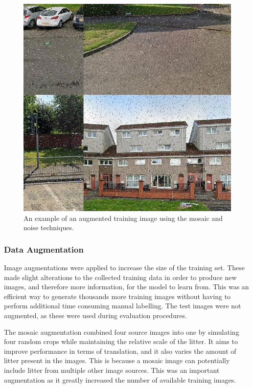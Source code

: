 \documentclass{thesis}
\begin{document}
\begin{figure}[h!]
    \centering
    \includegraphics[scale=0.4]{images/mosaic-noise-example.jpg}
    \caption{An example of an augmented training image using the mosaic and noise techniques.}
    \label{fig:mosaic-noise-image}
\end{figure}

\subsubsection{Data Augmentation}

Image augmentations were applied to increase the size of the training set. These made slight alterations to the collected training data in order to produce new images, and therefore more information, for the model to learn from. This was an efficient way to generate thousands more training images without having to perform additional time consuming manual labelling. The test images were not augmented, as these were used during evaluation procedures.

The mosaic augmentation combined four source images into one by simulating four random crops while maintaining the relative scale of the litter. It aims to improve performance in terms of translation, and it also varies the amount of litter present in the images. This is because a mosaic image can potentially include litter from multiple other image sources. This was an important augmentation as it greatly increased the number of available training images.
\end{document}
